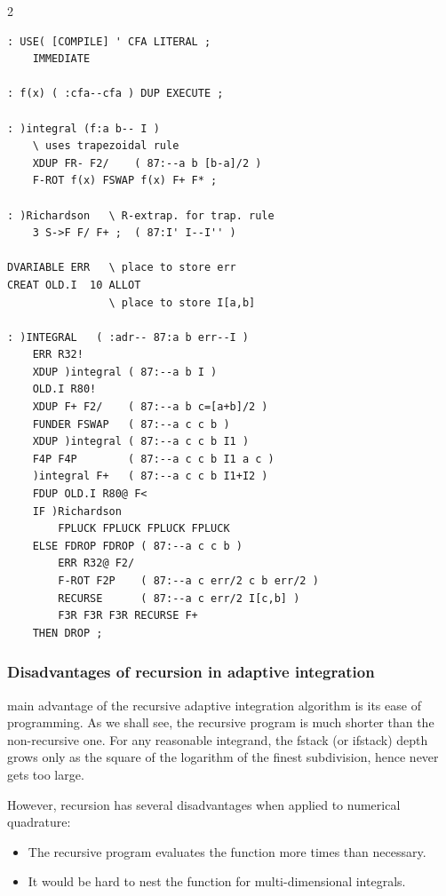 \begin{multicols}{2}
    \scriptsize
    \begin{lstlisting}
: USE( [COMPILE] ' CFA LITERAL ;
    IMMEDIATE

: f(x) ( :cfa--cfa ) DUP EXECUTE ;

: )integral (f:a b-- I )
    \ uses trapezoidal rule
    XDUP FR- F2/    ( 87:--a b [b-a]/2 )
    F-ROT f(x) FSWAP f(x) F+ F* ;

: )Richardson   \ R-extrap. for trap. rule
    3 S->F F/ F+ ;  ( 87:I' I--I'' )

DVARIABLE ERR   \ place to store err
CREAT OLD.I  10 ALLOT
                \ place to store I[a,b]

: )INTEGRAL   ( :adr-- 87:a b err--I )
    ERR R32!
    XDUP )integral ( 87:--a b I )
    OLD.I R80!
    XDUP F+ F2/    ( 87:--a b c=[a+b]/2 )
    FUNDER FSWAP   ( 87:--a c c b )
    XDUP )integral ( 87:--a c c b I1 )
    F4P F4P        ( 87:--a c c b I1 a c )
    )integral F+   ( 87:--a c c b I1+I2 )
    FDUP OLD.I R80@ F<
    IF )Richardson
        FPLUCK FPLUCK FPLUCK FPLUCK
    ELSE FDROP FDROP ( 87:--a c c b )
        ERR R32@ F2/
        F-ROT F2P    ( 87:--a c err/2 c b err/2 )
        RECURSE      ( 87:--a c err/2 I[c,b] )
        F3R F3R F3R RECURSE F+
    THEN DROP ;
    \end{lstlisting}
\end{multicols}

\subsubsection{Disadvantages of recursion in adaptive integration}
 main advantage of the recursive adaptive integration algorithm is its ease of programming. As we shall see, the recursive program is much shorter than the non-recursive one. For any reasonable integrand, the fstack (or ifstack) depth grows only as the square of the logarithm of the finest subdivision, hence never gets too large.

However, recursion has several disadvantages when applied to numerical quadrature:

\begin{itemize}
    \item The recursive program evaluates the function more times than necessary.
    \item It would be hard to nest the function  for multi-dimensional integrals.
\end{itemize}

